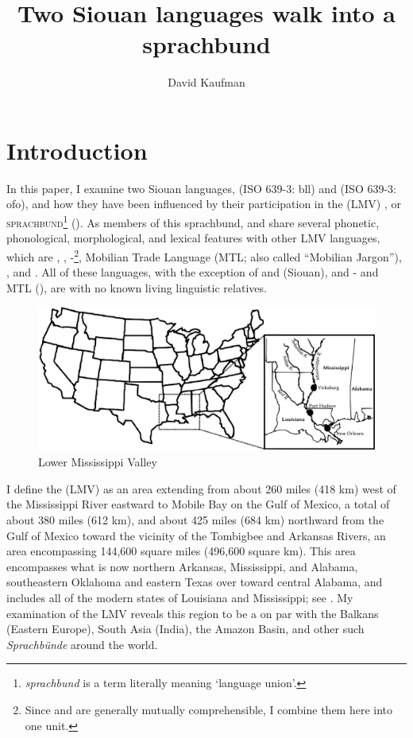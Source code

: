 \documentclass[output=paper]{LSP/langsci}
\author{David Kaufman}
\title{Two {Siouan} languages walk into a sprachbund}
\begin{document}
\section{Introduction}
In this paper, I examine two Siouan languages,  (ISO 639-3: bll) and  (ISO 639-3: ofo), and how they have been influenced by their participation in the  (LMV) , or \textsc{sprachbund}\footnote{\emph{sprachbund} is a  term literally meaning `language union'.} (\citealt[3]{Kaufman2014}). As members of this sprachbund,  and  share several phonetic, phonological, morphological, and lexical features with other LMV languages, which are , , -\footnote{Since  and  are generally mutually comprehensible, I combine them here into one unit.}, Mobilian Trade Language (MTL; also called ``Mobilian Jargon''), , and . All of these languages, with the exception of  and  (Siouan), and - and MTL (), are  with no known living linguistic relatives. 

\begin{figure}
\caption{Lower Mississippi Valley} \label{map}
\includegraphics[width=12cm]{figures/Kaufman1}
\end{figure}

I define the  (LMV) as an area extending from about 260 miles (418 km) west of the Mississippi River eastward to Mobile Bay on the Gulf of Mexico, a total of about 380 miles (612 km), and about 425 miles (684 km) northward from the Gulf of Mexico toward the vicinity of the Tombigbee and Arkansas Rivers, an area encompassing 144,600 square miles (496,600 square km). This area encompasses what is now northern Arkansas, Mississippi, and Alabama, southeastern Oklahoma and eastern Texas over toward central Alabama, and includes all of the modern states of Louisiana and Mississippi; see . My examination of the LMV reveals this region to be a  on par with the Balkans (Eastern Europe), South Asia (India), the Amazon Basin, and other such \textit{Sprachbünde} around the world.
\end{document}
